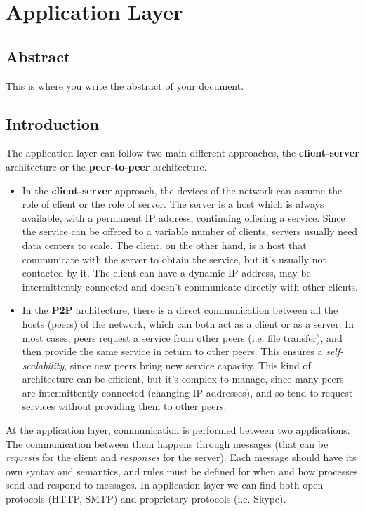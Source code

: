 \chapter[Application Layer]{Application Layer}

\section*{Abstract}         %
This is where you write the abstract of your document.

\section{Introduction}
The application layer can follow two main different approaches, the \textbf{client-server} architecture or the \textbf{peer-to-peer} architecture.
\begin{itemize}
    \item In the \textbf{client-server} approach, the devices of the network can assume the role of client or the role of server. The server is a host which is always available, with a permanent IP address, continuing offering a service. Since the service can be offered to a variable number of clients, servers usually need data centers to scale. The client, on the other hand, is a host that communicate with the server to obtain the service, but it's usually not contacted by it. The client can have a dynamic IP address, may be intermittently connected and doesn't communicate directly with other clients.
    \item In the \textbf{P2P} architecture, there is a direct communication between all the hosts (peers) of the network, which can both act as a client or as a server. In most cases, peers request a service from other peers (i.e. file transfer), and then provide the same service in return to other peers. This ensures a \textit{self-scalability}, since new peers bring new service capacity. This kind of architecture can be efficient, but it's complex to manage, since many peers are intermittently connected (changing IP addresses), and so tend to request services without providing them to other peers.
\end{itemize}

\noindent At the application layer, communication is performed between two applications. The communication between them happens through messages (that can be \textit{requests} for the client and \textit{responses} for the server). Each message should have its own syntax and semantics, and rules must be defined for when and how processes send and respond to messages. In application layer we can find both open protocols (HTTP, SMTP) and proprietary protocols (i.e. Skype).

